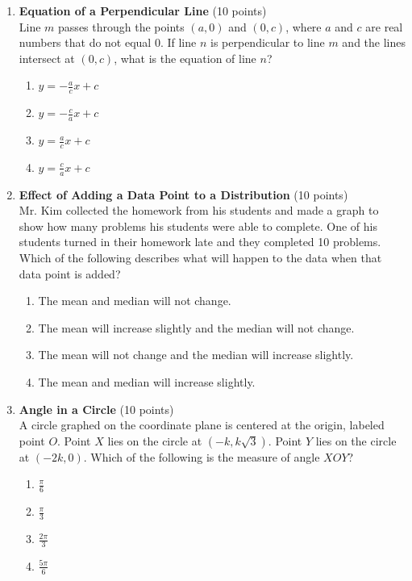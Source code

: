 \begin{enumerate}
  \item \textbf{Equation of a Perpendicular Line} (10 points)\\
  Line $m$ passes through the points $(a, 0)$ and $(0, c)$, where $a$ and $c$ are real numbers that do not equal 0. If line $n$ is perpendicular to line $m$ and the lines intersect at $(0, c)$, what is the equation of line $n$?
  \begin{enumerate}[label=(\Alph*)]
    \item $y = -\frac{a}{c}x + c$
    \item $y = -\frac{c}{a}x + c$
    \item $y = \frac{a}{c}x + c$
    \item $y = \frac{c}{a}x + c$
  \end{enumerate}
  \begin{subanswer}
  \end{subanswer}


  \newpage

  \item \textbf{Effect of Adding a Data Point to a Distribution} (10 points)\\
  Mr. Kim collected the homework from his students and made a graph to show how many problems his students were able to complete. One of his students turned in their homework late and they completed 10 problems. Which of the following describes what will happen to the data when that data point is added?
  \begin{enumerate}[label=(\Alph*)]
    \item The mean and median will not change.
    \item The mean will increase slightly and the median will not change.
    \item The mean will not change and the median will increase slightly.
    \item The mean and median will increase slightly.
  \end{enumerate}
  \begin{subanswer}
  \end{subanswer}

  \item \textbf{Angle in a Circle} (10 points)\\
  A circle graphed on the coordinate plane is centered at the origin, labeled point $O$. Point $X$ lies on the circle at $(-k, k\sqrt{3})$. Point $Y$ lies on the circle at $(-2k, 0)$. Which of the following is the measure of angle $XOY$?
  \begin{enumerate}[label=(\Alph*)]
    \item $\frac{\pi}{6}$
    \item $\frac{\pi}{3}$
    \item $\frac{2\pi}{3}$
    \item $\frac{5\pi}{6}$
  \end{enumerate}
  \begin{subanswer}
  \end{subanswer}



\end{enumerate}
